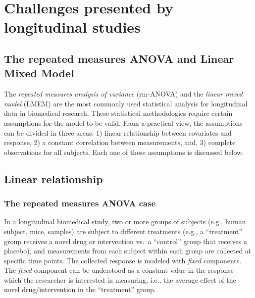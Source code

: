 \documentclass[
]{article}
\begin{document}
\FloatBarrier

\hypertarget{challenges-presented-by-longitudinal-studies}{%
\section{Challenges presented by longitudinal studies}\label{challenges-presented-by-longitudinal-studies}}

\hypertarget{the-repeated-measures-anova-and-linear-mixed-model}{%
\subsection{The repeated measures ANOVA and Linear Mixed Model}\label{the-repeated-measures-anova-and-linear-mixed-model}}

The \emph{repeated measures analysis of variance} (rm-ANOVA) and the \emph{linear mixed model} (LMEM) are the most commonly used statistical analysis for longitudinal data in biomedical research. These statistical methodologies require certain assumptions for the model to be valid. From a practical view, the assumptions can be divided in three areas: 1) linear relationship between covariates and response, 2) a constant correlation between measurements, and, 3) complete observations for all subjects. Each one of these assumptions is discussed below.

\hypertarget{linear-relationship}{%
\subsection{Linear relationship}\label{linear-relationship}}

\hypertarget{the-repeated-measures-anova-case}{%
\subsubsection{The repeated measures ANOVA case}\label{the-repeated-measures-anova-case}}

In a longitudinal biomedical study, two or more groups of subjects (e.g., human subject, mice, samples) are subject to different treatments (e.g., a ``treatment'' group receives a novel drug or intervention vs.~a ``control'' group that receives a placebo), and measurements from each subject within each group are collected at specific time points. The collected response is modeled with \emph{fixed} components. The \emph{fixed} component can be understood as a constant value in the response which the researcher is interested in measuring, i.e., the average effect of the novel drug/intervention in the ``treatment'' group.
\end{document}
